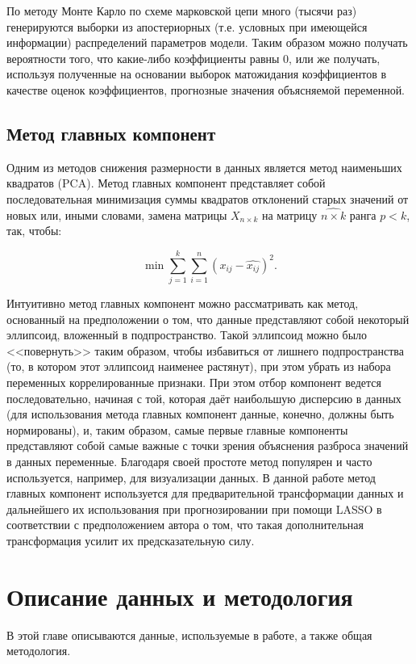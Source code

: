     
По методу Монте Карло по схеме марковской цепи много (тысячи раз) генерируются выборки из апостериорных (т.е. условных при имеющейся информации) распределений параметров модели. Таким образом можно получать вероятности того, что какие-либо коэффициенты равны 0, или же получать, используя полученные на основании выборок матожидания коэффициентов в качестве оценок коэффициентов, прогнозные значения объясняемой переменной.

\section{Метод главных компонент}
Одним из методов снижения размерности в данных является метод наименьших квадратов (PCA).
Метод главных компонент представляет собой последовательная минимизация суммы квадратов отклонений старых значений от новых или, иными словами, замена матрицы $X_{n \times k}$ на матрицу $\hat{{n \times k}}$ ранга $p < k$, так, чтобы:

\begin{equation}
    \min \sum_{j = 1}^k \sum_{i = 1}^{n}(x_{ij} - \hat{x_{ij}})^2.
\end{equation}

Интуитивно метод главных компонент можно рассматривать как метод, основанный на предположении о том, что данные представляют собой некоторый эллипсоид, вложенный в подпространство. Такой эллипсоид можно было <<повернуть>> таким образом, чтобы избавиться от лишнего подпространства (то, в котором этот эллипсоид наименее растянут), при этом убрать из набора переменных коррелированные признаки. При этом отбор компонент ведется последовательно, начиная с той, которая даёт наибольшую дисперсию в данных (для использования метода главных компонент данные, конечно, должны быть нормированы), и, таким образом, самые первые главные компоненты представляют собой самые важные с точки зрения объяснения разброса значений в данных переменные. 
Благодаря своей простоте метод популярен и часто используется, например, для визуализации данных. В данной работе метод главных компонент используется для предварительной трансформации данных и дальнейшего их использования при прогнозировании при помощи LASSO в соответствии с предположением автора о том, что такая дополнительная трансформация усилит их предсказательную силу.


\chapter{Описание данных и методология} \label{ch:data}
В этой главе описываются данные, используемые в работе, а также общая методология.
